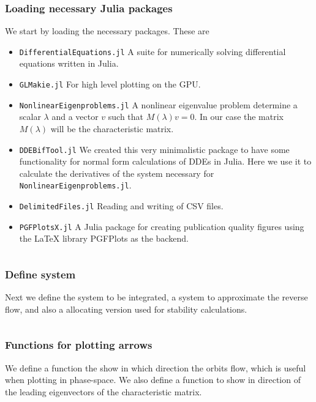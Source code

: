 \subsubsection{Loading necessary Julia packages}
We start by loading the necessary packages. These are
\begin{itemize}
    \item {\tt DifferentialEquations.jl} A suite for numerically solving differential equations written in Julia.
    \item {\tt GLMakie.jl} For high level plotting on the GPU.
    \item {\tt NonlinearEigenproblems.jl} A nonlinear eigenvalue problem determine a scalar $\lambda$ and a vector $v$ such that $M(\lambda)v=0$. In our case the matrix $M(\lambda)$ will be the characteristic matrix.
    \item {\tt DDEBifTool.jl} We created this very minimalistic package to have some functionality for normal form calculations of DDEs in Julia. Here we use it to calculate the derivatives of the system necessary for {\tt NonlinearEigenproblems.jl}.
    \item {\tt DelimitedFiles.jl} Reading and writing of CSV files.
    \item {\tt PGFPlotsX.jl} A Julia package for creating publication quality figures using the LaTeX library PGFPlots as the backend.
\end{itemize}
\newcommand\pathToJuliaFiles{/home/maikel/Documents/MyPapers/BTPaper/simulation}
\inputminted[firstline=1, lastline=8]{julia}{\pathToJuliaFiles/predator_prey_simulation_article.jl}

\subsubsection{Define system}
Next we define the system to be integrated, a system to approximate the reverse
flow, and also a allocating version used for stability calculations.
\inputminted[firstline=10, lastline=38]{julia}{\pathToJuliaFiles/predator_prey_simulation_article.jl}

\subsubsection{Functions for plotting arrows} \label{sm:eq:arrow_functions}
We define a function the show in which direction the orbits flow, which is
useful when plotting in phase-space. We also define a function to show in
direction of the leading eigenvectors of the characteristic matrix.

